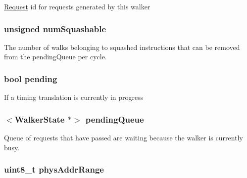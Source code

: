\label{classArmISA_1_1TableWalker_a96ec6a422ac492d05f8b3edc5b58532b}
\hyperlink{classRequest}{Request} id for requests generated by this walker \hypertarget{classArmISA_1_1TableWalker_acd34c708c5a97f4ce631bb3b00404045}{
\subsubsection[{numSquashable}]{\setlength{\rightskip}{0pt plus 5cm}unsigned {\bf numSquashable}}}
\label{classArmISA_1_1TableWalker_acd34c708c5a97f4ce631bb3b00404045}
The number of walks belonging to squashed instructions that can be removed from the pendingQueue per cycle. \hypertarget{classArmISA_1_1TableWalker_a39f16d585c4531d2bf2562631a775d73}{
\subsubsection[{pending}]{\setlength{\rightskip}{0pt plus 5cm}bool {\bf pending}}}
\label{classArmISA_1_1TableWalker_a39f16d585c4531d2bf2562631a775d73}
If a timing translation is currently in progress \hypertarget{classArmISA_1_1TableWalker_a53a70edbb255426f7f2729f482c7109b}{
\subsubsection[{pendingQueue}]{$<${\bf WalkerState} $\ast$$>$ {\bf pendingQueue}}}
\label{classArmISA_1_1TableWalker_a53a70edbb255426f7f2729f482c7109b}
Queue of requests that have passed are waiting because the walker is currently busy. \hypertarget{classArmISA_1_1TableWalker_af85538fbb375410b2750035ab34dc88a}{
\subsubsection[{physAddrRange}]{\setlength{\rightskip}{0pt plus 5cm}uint8\_\-t {\bf physAddrRange}}}
